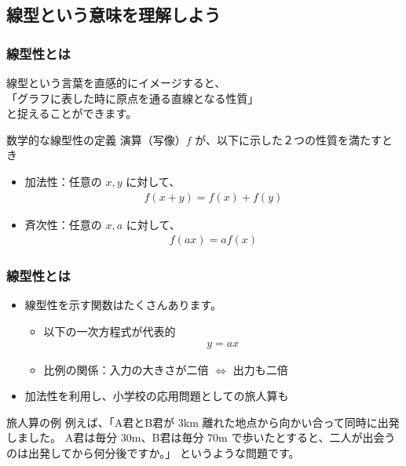\documentclass[12pt, dvipdfmx]{beamer}
\begin{document}
\subsection{線型という意味を理解しよう}
\begin{frame}
	\frametitle{線型性とは}
	線型という言葉を直感的にイメージすると、\\\alert{「グラフに表した時に原点を通る直線となる性質」}\\と捉えることができます。
	\begin{block}{数学的な線型性の定義}
		演算（写像）$f$ が、以下に示した２つの性質を満たすとき
		\begin{itemize}
			\item 加法性：任意の $x,y$ に対して、
			\begin{align*}
				f(x+y)=f(x)+f(y)
			\end{align*}
			\item 斉次性：任意の $x,a$ に対して、
			\begin{align*}
				f(ax)=af(x)
			\end{align*}
		\end{itemize}
	\end{block}
\end{frame}

\begin{frame}
	\frametitle{線型性とは}
		\begin{itemize}
			\item 線型性を示す関数はたくさんあります。
			\begin{itemize}
				\item 以下の一次方程式が代表的
					\begin{align*}
						y=ax
					\end{align*}
				\item 比例の関係：入力の大きさが二倍 $\Leftrightarrow$ 出力も二倍
			\end{itemize}
			\item 加法性を利用し、小学校の応用問題としての旅人算も
		\end{itemize}

	\begin{block}{旅人算の例}
		例えば、「A君とB君が 3km 離れた地点から向かい合って同時に出発しました。
		A君は毎分 30m、B君は毎分 70m で歩いたとすると、二人が出会うのは出発してから何分後ですか。」
		というような問題です。
	\end{block}
\end{frame}
\end{document}
